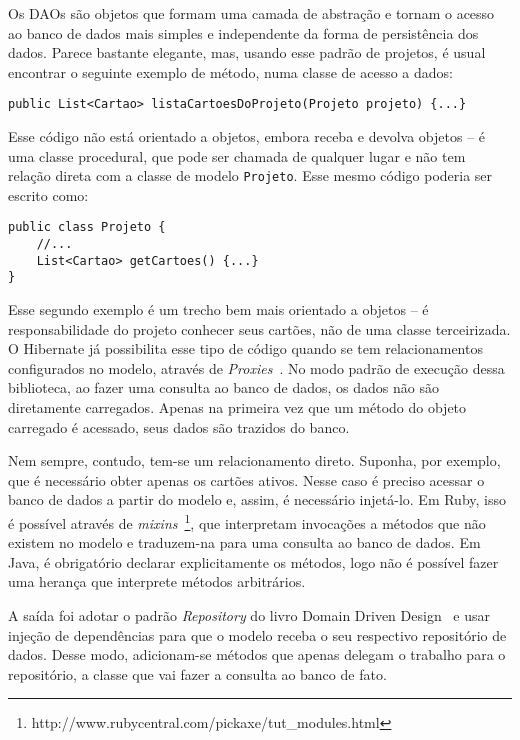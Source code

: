 Os DAOs são objetos que formam uma camada de abstração e tornam o acesso ao banco de dados mais simples e independente da forma de persistência dos dados. Parece bastante elegante, mas, usando esse padrão de projetos, é usual encontrar o seguinte exemplo de método, numa classe de acesso a dados:

\begin{lstlisting}
public List<Cartao> listaCartoesDoProjeto(Projeto projeto) {...}
\end{lstlisting}

Esse código não está orientado a objetos, embora receba e devolva objetos -- é uma classe procedural, que pode ser chamada de qualquer lugar e não tem relação direta com a classe de modelo \texttt{Projeto}. Esse mesmo código poderia ser escrito como:

\begin{lstlisting}
public class Projeto {
	//...
	List<Cartao> getCartoes() {...}
}
\end{lstlisting}

Esse segundo exemplo é um trecho bem mais orientado a objetos -- é responsabilidade do projeto conhecer seus cartões, não de uma classe terceirizada. O Hibernate já possibilita esse tipo de código quando se tem relacionamentos configurados no modelo, através de \textit{Proxies}~\cite{gof}. No modo padrão de execução dessa biblioteca, ao fazer uma consulta ao banco de dados, os dados não são diretamente carregados. Apenas na primeira vez que um método do objeto carregado é acessado, seus dados são trazidos do banco. 

Nem sempre, contudo, tem-se um relacionamento direto. Suponha, por exemplo, que é necessário obter apenas os cartões ativos. Nesse caso é preciso acessar o banco de dados a partir do modelo e, assim, é necessário injetá-lo. Em Ruby, isso é possível através de \textit{mixins}~\footnote{http://www.rubycentral.com/pickaxe/tut\_modules.html}, que interpretam invocações a métodos que não existem no modelo e traduzem-na para uma consulta ao banco de dados. Em Java, é obrigatório declarar explicitamente os métodos, logo não é possível fazer uma herança que interprete métodos arbitrários.

A saída foi adotar o padrão \textit{Repository} do livro Domain Driven Design~\cite{ddd} e usar injeção de dependências para que o modelo receba o seu respectivo repositório de dados. Desse modo, adicionam-se métodos que apenas delegam o trabalho para o repositório, a classe que vai fazer a consulta ao banco de fato.


